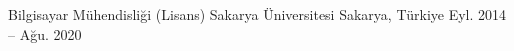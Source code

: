 

\begin{cventries}

  \cventry
    {Bilgisayar Mühendisliği (Lisans)}
    {Sakarya Üniversitesi}
    {Sakarya, Türkiye}
    {Eyl. 2014 -- Ağu. 2020}
    {}

\end{cventries}
